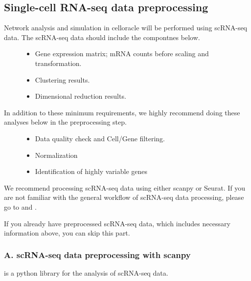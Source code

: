\documentclass[letterpaper,10pt,english]{sphinxmanual}
\begin{document}
\subsection{Single-cell RNA-seq data preprocessing}
\label{\detokenize{tutorials/scrnaprocess:single-cell-rna-seq-data-preprocessing}}\label{\detokenize{tutorials/scrnaprocess:scrnaprocess}}\label{\detokenize{tutorials/scrnaprocess::doc}}\begin{description}
\item[{Network analysis and simulation in celloracle will be performed using scRNA-seq data. The scRNA-seq data should include the compontnes below.}] \leavevmode\begin{itemize}
\item {} 
Gene expression matrix; mRNA counts before scaling and transformation.

\item {} 
Clustering results.

\item {} 
Dimensional reduction results.

\end{itemize}

\item[{In addition to these minimum requirements, we highly recommend doing these analyses below in the preprocessing step.}] \leavevmode\begin{itemize}
\item {} 
Data quality check and Cell/Gene filtering.

\item {} 
Normalization

\item {} 
Identification of highly variable genes

\end{itemize}

\end{description}

We recommend processing scRNA-seq data using either scanpy or Seurat.
If you are not familiar with the general workflow of scRNA-seq data processing, please go to  and  .

If you already have preprocessed scRNA-seq data, which includes necessary information above, you can skip this part.


\subsubsection{A. scRNA-seq data preprocessing with scanpy}
\label{\detokenize{tutorials/scrnaprocess:a-scrna-seq-data-preprocessing-with-scanpy}}
 is a python library for the analysis of scRNA-seq data.
\end{document}
